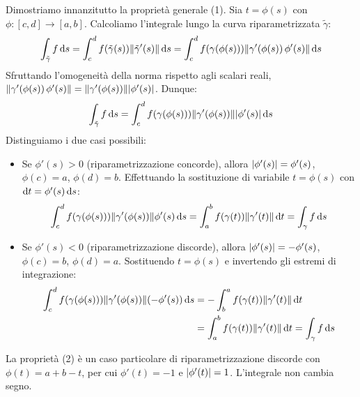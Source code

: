 \begin{dimostrazione}
Dimostriamo innanzitutto la proprietà generale (1). Sia $t = \phi(s)$ con $\phi: [c,d] \to [a,b]$.
Calcoliamo l'integrale lungo la curva riparametrizzata $\tilde{\gamma}$:
\[
\int_{\tilde{\gamma}} f \mathop{}\!\mathrm{d} s = \int_{c}^{d} f(\tilde{\gamma}(s)) \lVert\tilde{\gamma}'(s)\rVert \mathop{}\!\mathrm{d} s = \int_{c}^{d} f(\gamma(\phi(s))) \lVert\gamma'(\phi(s)) \, \phi'(s)\rVert \mathop{}\!\mathrm{d} s
\]
Sfruttando l'omogeneità della norma rispetto agli scalari reali, $\lVert\gamma'(\phi(s)) \, \phi'(s)\rVert = \lVert\gamma'(\phi(s))\rVert \lvert\phi'(s)\rvert$. Dunque:
\[
\int_{\tilde{\gamma}} f \mathop{}\!\mathrm{d} s = \int_{c}^{d} f(\gamma(\phi(s))) \lVert\gamma'(\phi(s))\rVert \lvert\phi'(s)\rvert \mathop{}\!\mathrm{d} s
\]
Distinguiamo i due casi possibili:
\begin{itemize}
    \item Se $\phi'(s) > 0$ (riparametrizzazione concorde), allora $\lvert\phi'(s)\rvert = \phi'(s)$, $\phi(c)=a$, $\phi(d)=b$. Effettuando la sostituzione di variabile $t = \phi(s)$ con $\mathop{}\!\mathrm{d} t = \phi'(s)\mathop{}\!\mathrm{d} s$:
    \[
    \int_{c}^{d} f(\gamma(\phi(s))) \lVert\gamma'(\phi(s))\rVert \phi'(s) \mathop{}\!\mathrm{d} s = \int_{a}^{b} f(\gamma(t)) \lVert\gamma'(t)\rVert \mathop{}\!\mathrm{d} t = \int_\gamma f \mathop{}\!\mathrm{d} s
    \]
    \item Se $\phi'(s) < 0$ (riparametrizzazione discorde), allora $\lvert\phi'(s)\rvert = -\phi'(s)$, $\phi(c)=b$, $\phi(d)=a$. Sostituendo $t = \phi(s)$ e invertendo gli estremi di integrazione:
    \begin{align*}
    \int_{c}^{d} f(\gamma(\phi(s))) \lVert\gamma'(\phi(s))\rVert (-\phi'(s)) \mathop{}\!\mathrm{d} s &= -\int_{b}^{a} f(\gamma(t)) \lVert\gamma'(t)\rVert \mathop{}\!\mathrm{d} t \\
    &= \int_{a}^{b} f(\gamma(t)) \lVert\gamma'(t)\rVert \mathop{}\!\mathrm{d} t = \int_\gamma f \mathop{}\!\mathrm{d} s
    \end{align*}
\end{itemize}
La proprietà (2) è un caso particolare di riparametrizzazione discorde con $\phi(t) = a + b - t$, per cui $\phi'(t) = -1$ e $\lvert\phi'(t)\rvert = 1$. L'integrale non cambia segno.
\end{dimostrazione}

